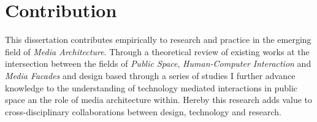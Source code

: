 




\section{Contribution}

This dissertation contributes empirically to research and practice in the emerging field of \textit{Media Architecture}. Through a theoretical review of existing works at the intersection between the fields of \textit{Public Space}, \textit{Human-Computer Interaction} and \textit{Media Facades} and design based through a series of studies I further advance knowledge to the understanding of technology mediated interactions in public space an the role of media architecture within. Hereby this research adds value to cross-disciplinary collaborations  between design, technology and research.


